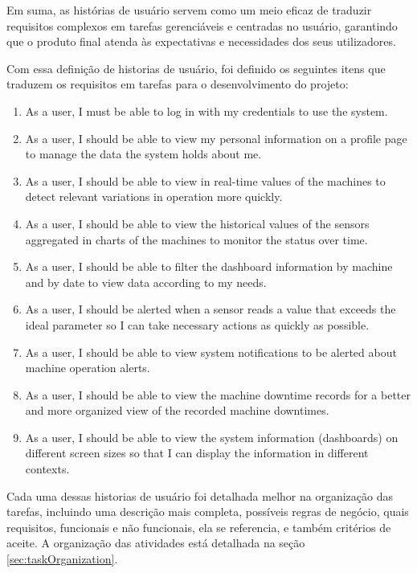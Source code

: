 Em suma, as histórias de usuário servem como um meio eficaz de traduzir requisitos complexos em tarefas gerenciáveis e centradas no usuário, garantindo que o produto final atenda às expectativas e necessidades dos seus utilizadores.

Com essa definição de historias de usuário, foi definido os seguintes itens que traduzem os requisitos em tarefas para o desenvolvimento do projeto:


\begin{enumerate}
    \item As a user, I must be able to log in with my credentials to use the system.
    \item As a user, I should be able to view my personal information on a profile page to manage the data the system holds about me.
    \item As a user, I should be able to view in real-time values of the machines to detect relevant variations in operation more quickly.
    \item As a user, I should be able to view the historical values of the sensors aggregated in charts of the machines to monitor the status over time.
    \item As a user, I should be able to filter the dashboard information by machine and by date to view data according to my needs.
    \item As a user, I should be alerted when a sensor reads a value that exceeds the ideal parameter so I can take necessary actions as quickly as possible.
    \item As a user, I should be able to view system notifications to be alerted about machine operation alerts.
    \item As a user, I should be able to view the machine downtime records for a better and more organized view of the recorded machine downtimes.
    \item As a user, I should be able to view the system information (dashboards) on different screen sizes so that I can display the information in different contexts.
\end{enumerate}

Cada uma dessas historias de usuário foi detalhada melhor na organização das tarefas, incluindo uma descrição mais completa, possíveis regras de negócio, quais requisitos, funcionais e não funcionais, ela se referencia, e também critérios de aceite. A organização das atividades está detalhada na seção \ref{sec:taskOrganization}.


